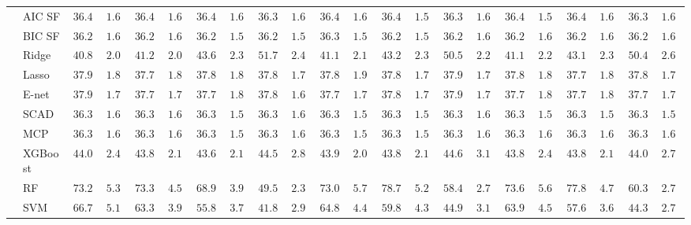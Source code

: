 \begin{tabular}{ll|ll|llllll|llllll|llllll}
	& AIC SF  & $36.41$ & $1.60$ & $36.41$ & $1.61$ & $36.40$ & $1.60$ & $36.39$ & $1.61$ & $36.41$ & $1.60$ & $36.41$ & $1.59$ & $36.37$ & $1.60$ & $36.40$ & $1.59$ & $36.40$ & $1.61$ & $36.39$ & $1.61$ \\
	& BIC SF  & $36.28$ & $1.60$ & $36.26$ & $1.62$ & $36.28$ & $1.59$ & $36.26$ & $1.59$ & $36.30$ & $1.58$ & $36.28$ & $1.59$ & $36.28$ & $1.62$ & $36.29$ & $1.60$ & $36.28$ & $1.60$ & $36.28$ & $1.61$ \\
	& Ridge  & $40.85$ & $2.02$ & $41.21$ & $2.02$ & $43.66$ & $2.34$ & $51.70$ & $2.49$ & $41.15$ & $2.18$ & $43.27$ & $2.36$ & $50.50$ & $2.23$ & $41.19$ & $2.21$ & $43.13$ & $2.37$ & $50.49$ & $2.66$ \\
	& Lasso  & $37.99$ & $1.80$ & $37.77$ & $1.81$ & $37.82$ & $1.88$ & $37.89$ & $1.77$ & $37.85$ & $1.90$ & $37.85$ & $1.78$ & $37.99$ & $1.76$ & $37.83$ & $1.86$ & $37.76$ & $1.88$ & $37.81$ & $1.75$ \\
	& E-net  & $37.93$ & $1.76$ & $37.73$ & $1.75$ & $37.76$ & $1.82$ & $37.82$ & $1.68$ & $37.78$ & $1.78$ & $37.81$ & $1.78$ & $37.95$ & $1.72$ & $37.77$ & $1.83$ & $37.73$ & $1.85$ & $37.78$ & $1.74$ \\
	& SCAD  & $36.31$ & $1.60$ & $36.31$ & $1.61$ & $36.32$ & $1.58$ & $36.32$ & $1.60$ & $36.30$ & $1.58$ & $36.34$ & $1.58$ & $36.34$ & $1.61$ & $36.32$ & $1.59$ & $36.33$ & $1.59$ & $36.33$ & $1.59$ \\
	& MCP  & $36.33$ & $1.62$ & $36.31$ & $1.61$ & $36.32$ & $1.59$ & $36.30$ & $1.63$ & $36.32$ & $1.57$ & $36.32$ & $1.57$ & $36.33$ & $1.61$ & $36.33$ & $1.60$ & $36.33$ & $1.60$ & $36.34$ & $1.60$ \\
	& XGBoost  & $44.06$ & $2.40$ & $43.89$ & $2.11$ & $43.61$ & $2.18$ & $44.52$ & $2.85$ & $43.94$ & $2.08$ & $43.87$ & $2.18$ & $44.68$ & $3.13$ & $43.86$ & $2.42$ & $43.88$ & $2.17$ & $44.06$ & $2.77$ \\
	& RF  & $73.27$ & $5.35$ & $73.37$ & $4.50$ & $68.90$ & $3.97$ & $49.51$ & $2.33$ & $73.02$ & $5.72$ & $78.72$ & $5.21$ & $58.40$ & $2.75$ & $73.60$ & $5.60$ & $77.88$ & $4.72$ & $60.38$ & $2.71$ \\
	& SVM  & $66.76$ & $5.12$ & $63.36$ & $3.98$ & $55.88$ & $3.75$ & $41.80$ & $2.98$ & $64.85$ & $4.47$ & $59.86$ & $4.36$ & $44.94$ & $3.12$ & $63.99$ & $4.57$ & $57.67$ & $3.69$ & $44.39$ & $2.74$ \\
	\hline 
\end{tabular}